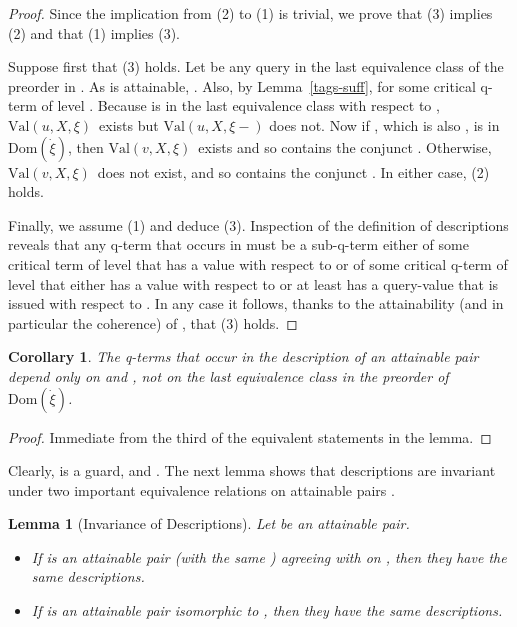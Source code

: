 \documentclass{LMCS}
\newtheorem{la}[thm]{Lemma}
\newtheorem{coro}[thm]{Corollary}
\theoremstyle{definition}
\newcommand{\ans}{\dot}
\newcommand{\dom}[1]{\ensuremath{{\text{Dom}}(#1)}}
\newcommand{\val}[3]{\ensuremath{\text{Val}(#1,#2,#3)}}
\begin{document}
\begin{proof}
Since the implication from (2) to (1) is trivial, we prove that (3)
implies (2) and that (1) implies (3).

Suppose first that (3) holds.  Let  be any query in the last
equivalence class of the preorder in .  As  is attainable,
.  Also, by Lemma~\ref{tags-suff},  for some critical q-term 
of level .  Because  is in the
last equivalence class with respect to , \val uX\xi\ exists but
\val uX{\xi-} does not.  Now if , which is also , is in \dom{\ans\xi}, then \val vX\xi\ exists and so
 contains the conjunct .  Otherwise, \val
vX\xi\ does not exist, and so  contains the conjunct
.  In either case, (2) holds.

Finally, we assume (1) and deduce (3).  Inspection of the definition
of descriptions reveals that any q-term  that occurs in
 must be a sub-q-term either of some critical term of
level  that has a value with respect to  or of some
critical q-term of level  that either has a value with respect
to  or at least has a query-value that is issued with respect
to .  In any case it follows, thanks to the attainability
(and in particular the coherence) of , that (3) holds.
\end{proof}

\begin{coro}
  The q-terms that occur in the description of an attainable pair
   depend only on  and , not on the last equivalence
  class in the preorder of \dom{\ans\xi}.
\end{coro}

\begin{proof}
  Immediate from the third of the equivalent statements in the lemma.
\end{proof}

Clearly,  is a guard, and
.  The next lemma shows that
descriptions are invariant under two important equivalence relations
on attainable pairs .

\begin{la}[Invariance of Descriptions] \label{invar-descr}
Let  be an attainable pair.
\begin{itemize}
\item If  is an attainable pair (with the same )
agreeing with  on , then they have the same
descriptions.
\item If  is an attainable pair isomorphic to ,
then they have the same descriptions.
\end{itemize}
\end{la}
\end{document}
